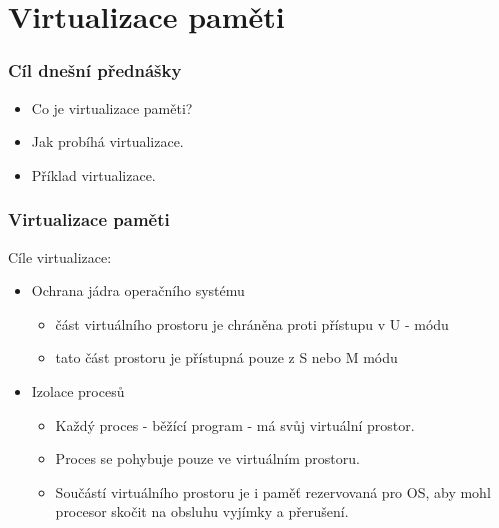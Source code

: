 \documentclass{beamer}
\subtitle{Lekce 10. Virtualizace paměti - stránkování}
\author{Pavel Píša \phantom{xxxxxxxxx} Petr Štěpán \\ \small\texttt{pisa@fel.cvut.cz}\phantom{xxxx}\small\texttt{stepan@fel.cvut.cz}}
\begin{document}
\maketitle

\section{Virtualizace paměti}

\begin{frame}
\frametitle{Cíl dnešní přednášky}

\begin{itemize}
 \item Co je virtualizace paměti?
 \item Jak probíhá virtualizace.
 \item Příklad virtualizace.
\end{itemize}
\end{frame}


\begin{frame}
\frametitle{Virtualizace paměti}

Cíle virtualizace:
\begin{itemize}
 \item Ochrana jádra operačního systému
 \begin{itemize}
 \item část virtuálního prostoru je chráněna proti přístupu v U - módu
 \item tato část prostoru je přístupná pouze z S nebo M módu
\end{itemize}
\item Izolace procesů
 \begin{itemize}
 \item Každý proces - běžící program - má svůj virtuální prostor.
 \item Proces se pohybuje pouze ve virtuálním prostoru.
 \item Součástí virtuálního prostoru je i paměť rezervovaná pro OS, aby mohl procesor skočit na obsluhu vyjímky a přerušení.
\end{itemize}
\end{itemize}
\end{frame}
\end{document}

